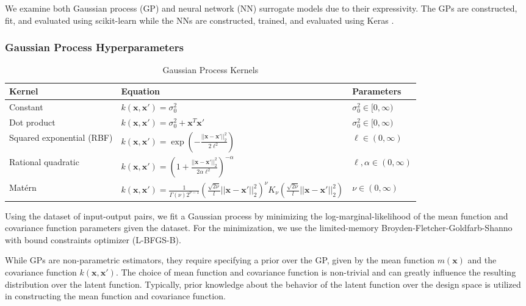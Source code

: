 \documentclass[conference,final]{IEEEtran}
\begin{document}
	We examine both Gaussian process (GP) and neural network (NN) surrogate models due to their expressivity. The GPs are constructed, fit, and evaluated using scikit-learn \cite{Scikit-learn:Python} while the NNs are constructed, trained, and evaluated using Keras \cite{Keras:API}.
	
	\subsubsection{Gaussian Process Hyperparameters}
	
	\begin{table*}[htbp]
    \renewcommand{\arraystretch}{2.2}
    \centering
    \caption{Gaussian Process Kernels}
    \label{tab:gp_kernels}
        \begin{tabular}{lll}
        \toprule 
        \bfseries Kernel & \bfseries Equation & \bfseries Parameters \\ \midrule
	    Constant &  $k(\mathbf{x}, \mathbf{x}') = \sigma_0^2$ & $\sigma_0^2 \in [0, \infty)$ \\
	    Dot product & $k(\mathbf{x}, \mathbf{x}') = \sigma_0^2 + \mathbf{x}^T \mathbf{x}'$ & $\sigma_0^2 \in [0, \infty)$ \\
	    Squared exponential (RBF) & $k(\mathbf{x}, \mathbf{x}') = \exp \left( -\frac{||\mathbf{x} - \mathbf{x}'||_2^2}{2\ell^2} \right)$ & $\ell \in (0, \infty)$ \\
	    Rational quadratic & $k(\mathbf{x}, \mathbf{x}') = \left(1+\frac{||\mathbf{x} - \mathbf{x}'||_2^2}{2\alpha \ell^2}\right)^{-\alpha}$ & $\ell, \alpha \in (0, \infty)$ \\
	    Mat\'ern & $k(\mathbf{x}, \mathbf{x}') = \frac{1}{\Gamma(\nu)2^{\nu-1}}\left(\frac{\sqrt{2\nu}}{l} ||\mathbf{x} - \mathbf{x}'||_2^2 \right)^\nu K_\nu\left(\frac{\sqrt{2\nu}}{l} ||\mathbf{x} - \mathbf{x}'||_2^2 \right)$ & $\nu \in (0, \infty)$ \\ \bottomrule
	    \end{tabular}
	\end{table*}
	
	Using the dataset of input-output pairs, we fit a Gaussian process by minimizing the log-marginal-likelihood of the mean function and covariance function parameters given the dataset. For the minimization, we use the limited-memory Broyden-Fletcher-Goldfarb-Shanno with bound constraints optimizer (\textsc{L-BFGS-B}).
	
	While GPs are non-parametric estimators, they require specifying a prior over the GP, given by the mean function $m(\boldsymbol{x})$ and the covariance function $k(\boldsymbol{x}, \boldsymbol{x}')$. The choice of mean function and covariance function is non-trivial and can greatly influence the resulting distribution over the latent function. Typically, prior knowledge about the behavior of the latent function over the design space is utilized in constructing the mean function and covariance function.
	
\end{document}
